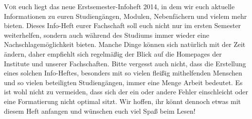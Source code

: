 \thispagestyle{plain}
\lettrine[lines=3,loversize=0.2,slope=-15,lhang=0.2]{V}{or} euch liegt das neue Erstsemester-Infoheft 2014, in dem wir euch aktuelle Informationen zu euren Studiengängen, Modulen, Nebenfächern und vielem mehr bieten. Dieses Info-Heft eurer Fachschaft soll euch nicht nur im ersten Semester weiterhelfen, sondern auch während des Studiums immer wieder eine Nachschlagemöglichkeit bieten. Manche Dinge können sich natürlich mit der Zeit ändern, daher empfiehlt sich regelmäßig der Blick auf die Homepages der Institute und unserer Fachschaften. Bitte vergesst auch nicht, dass die Erstellung eines solchen Info-Heftes, besonders mit so vielen fleißig mithelfenden Menschen und so vielen beteiligten Studiengängen, immer eine Menge Arbeit bedeutet. Es ist wohl nicht zu vermeiden, dass sich der ein oder andere Fehler einschleicht oder eine Formatierung nicht optimal sitzt. Wir hoffen, ihr könnt dennoch etwas mit diesem Heft anfangen und wünschen euch viel Spaß beim Lesen!

